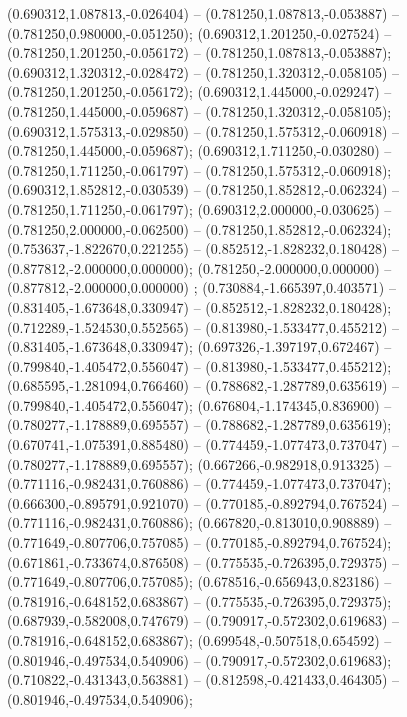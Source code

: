  (0.690312,1.087813,-0.026404) -- (0.781250,1.087813,-0.053887) -- (0.781250,0.980000,-0.051250);
 (0.690312,1.201250,-0.027524) -- (0.781250,1.201250,-0.056172) -- (0.781250,1.087813,-0.053887);
 (0.690312,1.320312,-0.028472) -- (0.781250,1.320312,-0.058105) -- (0.781250,1.201250,-0.056172);
 (0.690312,1.445000,-0.029247) -- (0.781250,1.445000,-0.059687) -- (0.781250,1.320312,-0.058105);
 (0.690312,1.575313,-0.029850) -- (0.781250,1.575312,-0.060918) -- (0.781250,1.445000,-0.059687);
 (0.690312,1.711250,-0.030280) -- (0.781250,1.711250,-0.061797) -- (0.781250,1.575312,-0.060918);
 (0.690312,1.852812,-0.030539) -- (0.781250,1.852812,-0.062324) -- (0.781250,1.711250,-0.061797);
 (0.690312,2.000000,-0.030625) -- (0.781250,2.000000,-0.062500) -- (0.781250,1.852812,-0.062324);
 (0.753637,-1.822670,0.221255) -- (0.852512,-1.828232,0.180428) -- (0.877812,-2.000000,0.000000);
 (0.781250,-2.000000,0.000000) -- (0.877812,-2.000000,0.000000) ;
 (0.730884,-1.665397,0.403571) -- (0.831405,-1.673648,0.330947) -- (0.852512,-1.828232,0.180428);
 (0.712289,-1.524530,0.552565) -- (0.813980,-1.533477,0.455212) -- (0.831405,-1.673648,0.330947);
 (0.697326,-1.397197,0.672467) -- (0.799840,-1.405472,0.556047) -- (0.813980,-1.533477,0.455212);
 (0.685595,-1.281094,0.766460) -- (0.788682,-1.287789,0.635619) -- (0.799840,-1.405472,0.556047);
 (0.676804,-1.174345,0.836900) -- (0.780277,-1.178889,0.695557) -- (0.788682,-1.287789,0.635619);
 (0.670741,-1.075391,0.885480) -- (0.774459,-1.077473,0.737047) -- (0.780277,-1.178889,0.695557);
 (0.667266,-0.982918,0.913325) -- (0.771116,-0.982431,0.760886) -- (0.774459,-1.077473,0.737047);
 (0.666300,-0.895791,0.921070) -- (0.770185,-0.892794,0.767524) -- (0.771116,-0.982431,0.760886);
 (0.667820,-0.813010,0.908889) -- (0.771649,-0.807706,0.757085) -- (0.770185,-0.892794,0.767524);
 (0.671861,-0.733674,0.876508) -- (0.775535,-0.726395,0.729375) -- (0.771649,-0.807706,0.757085);
 (0.678516,-0.656943,0.823186) -- (0.781916,-0.648152,0.683867) -- (0.775535,-0.726395,0.729375);
 (0.687939,-0.582008,0.747679) -- (0.790917,-0.572302,0.619683) -- (0.781916,-0.648152,0.683867);
 (0.699548,-0.507518,0.654592) -- (0.801946,-0.497534,0.540906) -- (0.790917,-0.572302,0.619683);
 (0.710822,-0.431343,0.563881) -- (0.812598,-0.421433,0.464305) -- (0.801946,-0.497534,0.540906);
